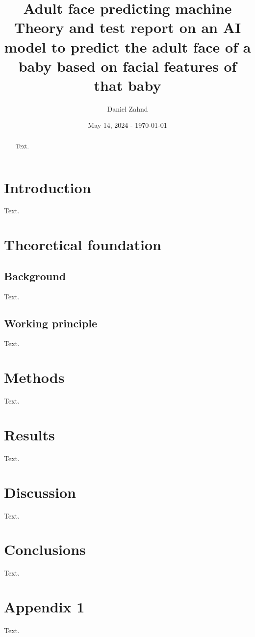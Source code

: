 \documentclass[a4paper,10pt, twocolumn]{article}
\author{Daniel Zahnd}
\date{May 14, 2024 - \today}
\title{Adult face predicting machine \\ \vspace{0.5cm} \normalsize Theory and test report on an AI model to predict the adult face of a baby based on facial features of that baby}
\begin{document}
\maketitle


\begin{abstract}
Text.
\end{abstract}

\section{Introduction}
Text.

\section{Theoretical foundation}
\subsection{Background}
Text.

\subsection{Working principle}
Text.

\section{Methods}
Text.

\section{Results}

Text.

\section{Discussion}
Text.

\section{Conclusions}
Text.

\appendix
\section{Appendix 1}
Text.



\end{document}
